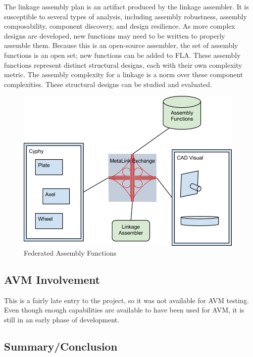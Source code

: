 \documentclass[]{report}
\begin{document}
The linkage assembly plan is an artifact produced by the linkage assembler. 
It is susceptible to several types of analysis, including assembly robustness, 
assembly composability, component discovery, and design resilience. 
As more complex designs are developed, new functions may need to be written to properly assemble them. 
Because this is an open-source assembler, the set of assembly functions is an open set; 
new functions can be added to FLA. 
These assembly functions represent distinct structural designs, 
each with their own complexity metric. 
The assembly complexity for a linkage is a norm over these component complexities. 
These structural designs can be studied and evaluated.

\begin{figure}[h!]
	\centering
	\includegraphics[scale=0.7]{images/image17.png}
	\caption{Federated Assembly Functions}
	\label{fig:async-metalink}
\end{figure}

\subsection{AVM Involvement}

This is a fairly late entry to the project, so it was not available for AVM testing.  
Even though enough capabilities are available to have been used for AVM, it is still in an early phase of development.

\subsection{Summary/Conclusion} 
\end{document}
